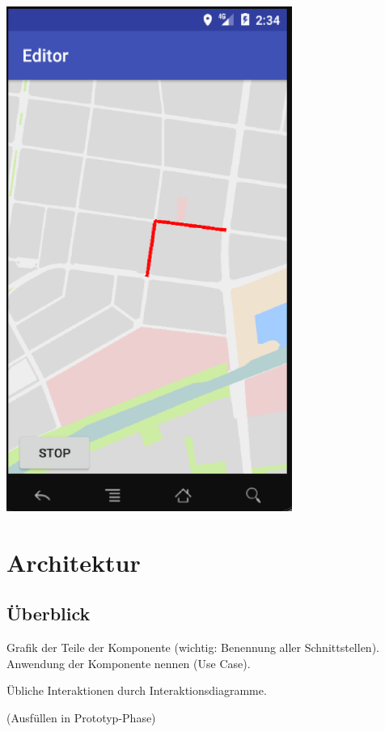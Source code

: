 \includegraphics[width=0.7\textwidth]{AndroidEditorOV}

\section{Architektur}

\subsection{Überblick}
Grafik der Teile der Komponente (wichtig: Benennung aller Schnittstellen). 
Anwendung der Komponente nennen (Use Case).

Übliche Interaktionen durch Interaktionsdiagramme.

(Ausfüllen in Prototyp-Phase)

